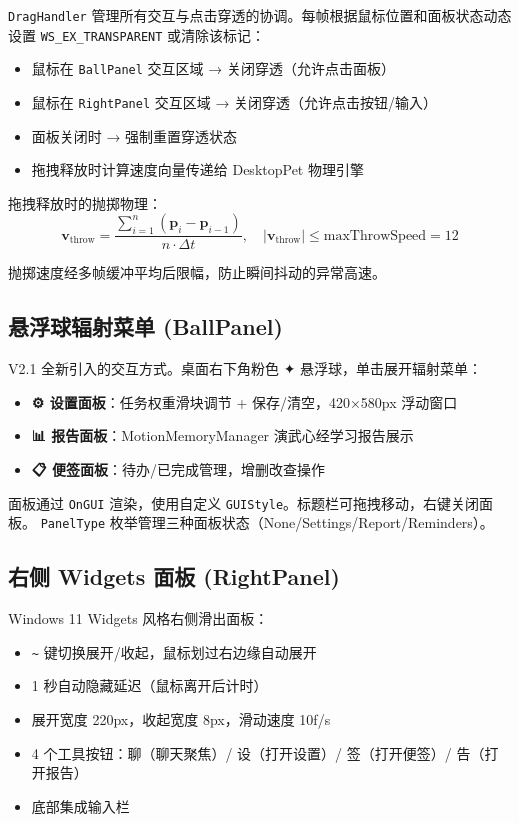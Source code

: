 \documentclass[12pt,a4paper]{ctexart}
\begin{document}
\texttt{DragHandler} 管理所有交互与点击穿透的协调。每帧根据鼠标位置和面板状态动态设置
\texttt{WS\_EX\_TRANSPARENT} 或清除该标记：

\begin{itemize}
    \item 鼠标在 \texttt{BallPanel} 交互区域 → 关闭穿透（允许点击面板）
    \item 鼠标在 \texttt{RightPanel} 交互区域 → 关闭穿透（允许点击按钮/输入）
    \item 面板关闭时 → 强制重置穿透状态
    \item 拖拽释放时计算速度向量传递给 DesktopPet 物理引擎
\end{itemize}

拖拽释放时的抛掷物理：
\[
\mathbf{v}_{\text{throw}} = \frac{\sum_{i=1}^{n} (\mathbf{p}_{i} - \mathbf{p}_{i-1})}{n \cdot \Delta t},\quad
|\mathbf{v}_{\text{throw}}| \leq \text{maxThrowSpeed}=12
\]

抛掷速度经多帧缓冲平均后限幅，防止瞬间抖动的异常高速。

\subsection{悬浮球辐射菜单 (BallPanel)}

V2.1 全新引入的交互方式。桌面右下角粉色 ✦ 悬浮球，单击展开辐射菜单：

\begin{itemize}
    \item \textbf{⚙ 设置面板}：任务权重滑块调节 + 保存/清空，420×580px 浮动窗口
    \item \textbf{📊 报告面板}：MotionMemoryManager 演武心经学习报告展示
    \item \textbf{📋 便签面板}：待办/已完成管理，增删改查操作
\end{itemize}

面板通过 \texttt{OnGUI} 渲染，使用自定义 \texttt{GUIStyle}。标题栏可拖拽移动，右键关闭面板。
\texttt{PanelType} 枚举管理三种面板状态（None/Settings/Report/Reminders）。

\subsection{右侧 Widgets 面板 (RightPanel)}

Windows 11 Widgets 风格右侧滑出面板：

\begin{itemize}
    \item \texttt{\textasciitilde} 键切换展开/收起，鼠标划过右边缘自动展开
    \item 1 秒自动隐藏延迟（鼠标离开后计时）
    \item 展开宽度 220px，收起宽度 8px，滑动速度 10f/s
    \item 4 个工具按钮：聊（聊天聚焦）/ 设（打开设置）/ 签（打开便签）/ 告（打开报告）
    \item 底部集成输入栏
\end{itemize}
\end{document}
